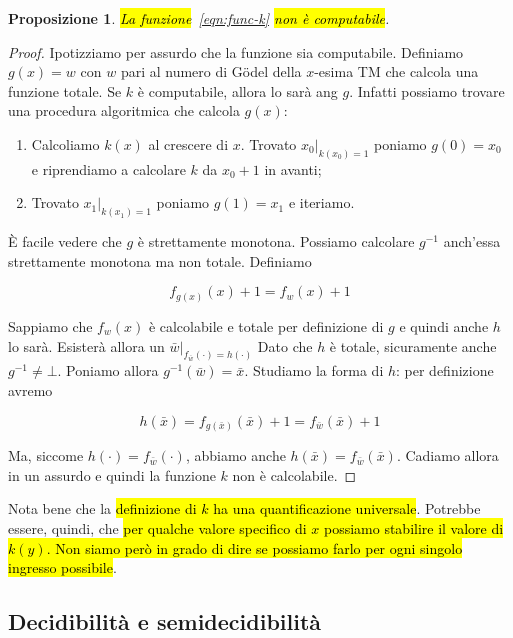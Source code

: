 \documentclass[a4paper,11pt,oneside]{article}
\theoremstyle{plain}
\newtheorem{prop}{Proposizione}[section]
\theoremstyle{definition}
\theoremstyle{remark}
\begin{document}
\begin{prop}
  \hl{La funzione}~\ref{eqn:func-k} \hl{non è computabile}.
\end{prop}
\begin{proof}
  Ipotizziamo per assurdo che la funzione sia computabile. Definiamo $g(x) = w$
  con $w$ pari al numero di Gödel della $x$-esima TM che calcola una funzione
  totale. Se $k$ è computabile, allora lo sarà ang $g$. Infatti possiamo trovare
  una procedura algoritmica che calcola $g(x)$:

  \begin{enumerate}
    \item Calcoliamo $k(x)$ al crescere di $x$. Trovato $x_0|_{k(x_0)=1}$
      poniamo $g(0) = x_0$ e riprendiamo a calcolare $k$ da $x_0 + 1$ in avanti;
    \item Trovato $x_1|_{k(x_1)=1}$ poniamo $g(1) = x_1$ e iteriamo.
  \end{enumerate}

  È facile vedere che $g$ è strettamente monotona. Possiamo calcolare $g^{-1}$
  anch'essa strettamente monotona ma non totale. Definiamo

  \[
    f_{g(x)}(x) +1 = f_w(x) +1
  \]

  Sappiamo che $f_w(x)$ è calcolabile e totale per definizione di $g$ e quindi
  anche $h$ lo sarà. Esisterà allora un $\bar{w}|_{f_{\bar{w}}(\cdot)=h(\cdot)}$
  Dato che $h$ è totale, sicuramente anche $g^{-1} \neq \bot$. Poniamo allora
  $g^{-1}(\bar{w})=\bar{x}$. Studiamo la forma di $h$: per definizione avremo

  \[
    h(\bar{x})=f_{g(\bar{x})}(\bar{x}) + 1 = f_{\bar{w}}(\bar{x}) +1
  \]

  Ma, siccome $h(\cdot) = f_{\bar{w}}(\cdot)$, abbiamo anche $h(\bar{x}) =
  f_{\bar{w}}(\bar{x})$. Cadiamo allora in un assurdo e quindi la funzione $k$
  non è calcolabile.
\end{proof}

Nota bene che la \hl{definizione di $k$ ha una quantificazione universale}.
Potrebbe essere, quindi, che \hl{per qualche valore specifico di $x$ possiamo
stabilire il valore di $k(y)$. Non siamo però in grado di dire se possiamo farlo
per ogni singolo ingresso possibile}.

\subsection{Decidibilità e semidecidibilità}\label{sec:problemi-decisione}
\end{document}
